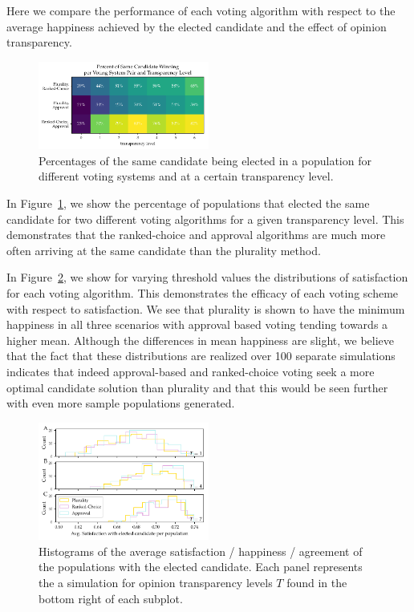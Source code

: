 Here we compare the performance of each voting algorithm with respect to the average happiness achieved by the elected candidate and the effect of opinion transparency.
\begin{figure}[h!]
    \includegraphics[width=0.5\textwidth]{figs/same_winners.pdf}
    \caption{Percentages of the same candidate being elected in a population for different voting systems and at a certain transparency level.}
    \label{fig:winmatch}
\end{figure}

In Figure~\ref{fig:winmatch}, we show the percentage of populations that elected the same candidate for two different voting algorithms for a given transparency level.
This demonstrates that the ranked-choice and approval algorithms are much more often arriving at the same candidate than the plurality method.

In Figure~\ref{fig:satisfaction_hists}, we show for varying threshold values the distributions of satisfaction for each
voting algorithm. This demonstrates the efficacy of each voting scheme with respect to satisfaction.
We see that plurality is shown to have the minimum happiness in all three scenarios with approval based voting tending towards a higher mean.
Although the differences in mean happiness are slight, we believe that the fact that these distributions are realized over
100 separate simulations indicates that indeed approval-based and ranked-choice voting seek a more optimal candidate solution
than plurality and that this would be seen further with even more sample populations generated.
\begin{figure}[h!]
\includegraphics[width=0.5\textwidth]{figs/satisfaction-hist_avgperpop.pdf}
\caption{Histograms of the average satisfaction / happiness / agreement of the populations with the elected
candidate. Each panel represents the a simulation for opinion transparency levels $T$ found in the bottom right of each subplot.}
\label{fig:satisfaction_hists}
\end{figure}

